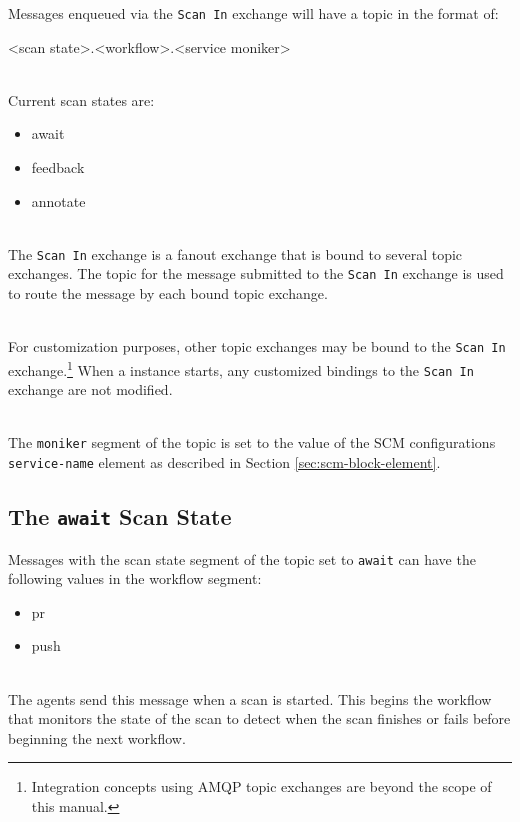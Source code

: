 Messages enqueued via the \texttt{Scan In} exchange will have a topic in the format of:

\begin{code}{}{}{}
<scan state>.<workflow>.<service moniker>
\end{code}

\noindent\\Current scan states are:

\begin{itemize}
    \item await
    \item feedback
    \item annotate
\end{itemize}

\noindent\\The \texttt{Scan In} exchange is a fanout exchange that is bound to several topic
exchanges.  The topic for the message submitted to the \texttt{Scan In} exchange is used to
route the message by each bound topic exchange.

\noindent\\For customization purposes, other topic
exchanges may be bound to the \texttt{Scan In} exchange.\footnote{Integration concepts
using AMQP topic exchanges are beyond the scope of this manual.} When a \cxoneflow instance starts,
any customized bindings to the \texttt{Scan In} exchange are not modified.


\noindent\\The \texttt{moniker} segment of the topic is set to the value of the
SCM configurations \texttt{service-name} element as described in
Section \ref{sec:scm-block-element}.

\subsection{The \texttt{await} Scan State}

Messages with the scan state segment of the topic set to \texttt{await} can have the following
values in the workflow segment:

\begin{itemize}
    \item pr
    \item push
\end{itemize}

\noindent\\The \cxoneflow agents send this message when a scan is started.  This begins
the workflow that monitors the state of the scan to detect when the scan finishes
or fails before beginning the next workflow.


